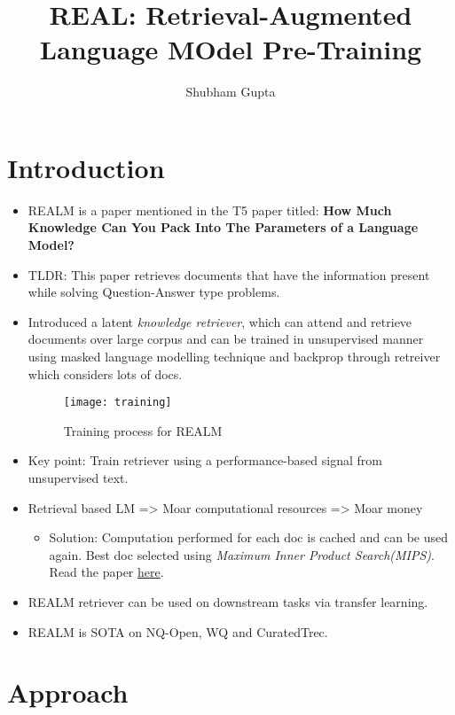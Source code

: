 \documentclass[a4paper]{article}
\title{REAL: Retrieval-Augmented Language MOdel Pre-Training}
\author{Shubham Gupta}
\begin{document}
\maketitle
\section{Introduction}
\begin{itemize}
    \item REALM is a paper mentioned in the T5 paper titled: \textbf{How Much Knowledge Can You Pack Into The Parameters of a Language Model?}
    \item TLDR: This paper retrieves documents that have the information present while solving Question-Answer type problems.
    \item Introduced a latent \textit{knowledge retriever}, which can attend and retrieve documents over large corpus and can be trained in unsupervised manner using masked language modelling technique and backprop through retreiver which considers lots of docs.
        \begin{figure}[H]
            \centering
            \texttt{[image: training]}
            \caption{Training process for REALM}
            \label{fig:training}
        \end{figure}
    \item Key point: Train retriever using a performance-based signal from unsupervised text.
    \item Retrieval based LM => Moar computational resources => Moar money
        \begin{itemize}
            \item Solution: Computation performed for each doc is cached and can be used again. Best doc selected using \textit{Maximum Inner Product Search(MIPS)}. Read the paper \href{https://cs.stanford.edu/~ermon/papers/ICML_MIPS_Gumbel.pdf}{here}.  
        \end{itemize}
    \item REALM retriever can be used on downstream tasks via transfer learning.
    \item REALM is SOTA on NQ-Open, WQ and CuratedTrec.
\end{itemize}
\section{Approach}
\end{document}
